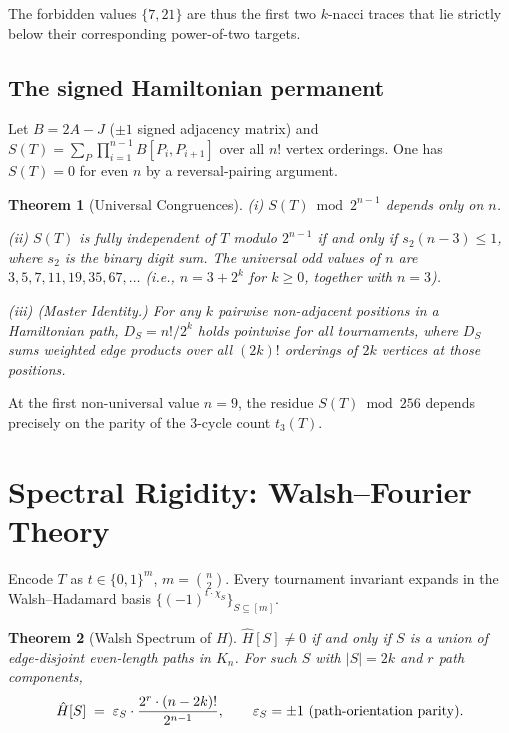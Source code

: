 \documentclass[11pt,reqno]{amsart}
\theoremstyle{plain}
\newtheorem{thm}{Theorem}[section]
\theoremstyle{definition}
\theoremstyle{remark}
\begin{document}
The forbidden values $\{7,21\}$ are thus the first two $k$-nacci traces that
lie strictly below their corresponding power-of-two targets.

\subsection*{The signed Hamiltonian permanent}

Let $B=2A-J$ ($\pm 1$ signed adjacency matrix) and
$S(T)=\sum_{P}\prod_{i=1}^{n-1}B[P_i,P_{i+1}]$
over all $n!$ vertex orderings.  One has $S(T)=0$ for even $n$ by a
reversal-pairing argument.

\begin{thm}[Universal Congruences]\label{thm:signed}
\textup{(i)} $S(T)\bmod 2^{n-1}$ depends only on $n$.

\textup{(ii)} $S(T)$ is fully independent of $T$ modulo $2^{n-1}$
if and only if $s_2(n-3)\le 1$, where $s_2$ is the binary digit sum.
The universal odd values of $n$ are $3,5,7,11,19,35,67,\ldots$
\textup{(}i.e., $n=3+2^k$ for $k\ge 0$, together with $n=3$\textup{)}.

\textup{(iii)} \emph{(Master Identity.)} For any $k$ pairwise non-adjacent
positions in a Hamiltonian path,
$D_S = n!/2^k$
holds pointwise for all tournaments, where $D_S$ sums weighted edge products
over all $(2k)!$ orderings of $2k$ vertices at those positions.
\end{thm}

At the first non-universal value $n=9$, the residue $S(T)\bmod 256$
depends precisely on the parity of the $3$-cycle count $t_3(T)$.

\section{Spectral Rigidity: Walsh--Fourier Theory}\label{sec:walsh}

Encode $T$ as $t\in\{0,1\}^m$, $m=\binom{n}{2}$.  Every tournament invariant
expands in the Walsh--Hadamard basis $\{(-1)^{t\cdot\chi_S}\}_{S\subseteq[m]}$.

\begin{thm}[Walsh Spectrum of $H$]\label{thm:walsh}
$\hat H[S]\ne 0$ if and only if $S$ is a union of edge-disjoint even-length
paths in $K_n$.  For such $S$ with $|S|=2k$ and $r$ path components,
\[
\hat H[S] \;=\; \varepsilon_S\cdot\frac{2^r\cdot(n-2k)!}{2^{n-1}},
\qquad \varepsilon_S=\pm 1\ \text{\textup{(}path-orientation parity\textup{)}}.
\]
\end{thm}
\end{document}
